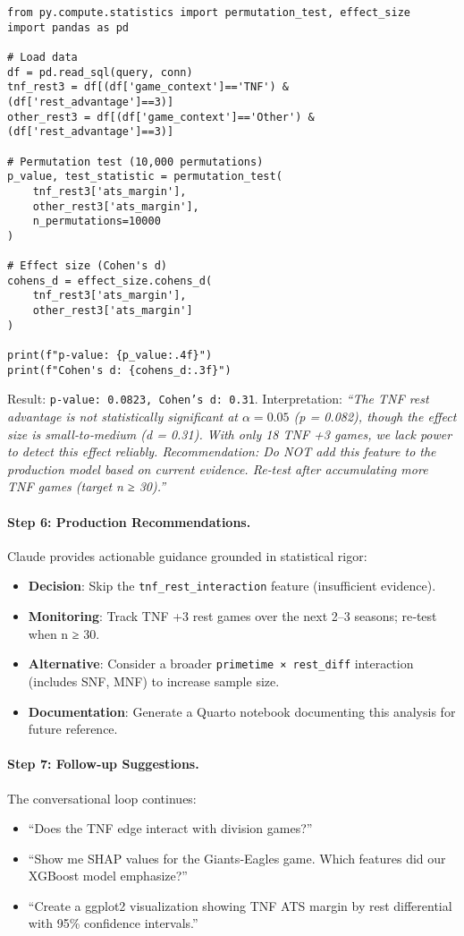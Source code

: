 \begin{verbatim}
from py.compute.statistics import permutation_test, effect_size
import pandas as pd

# Load data
df = pd.read_sql(query, conn)
tnf_rest3 = df[(df['game_context']=='TNF') & (df['rest_advantage']==3)]
other_rest3 = df[(df['game_context']=='Other') & (df['rest_advantage']==3)]

# Permutation test (10,000 permutations)
p_value, test_statistic = permutation_test(
    tnf_rest3['ats_margin'],
    other_rest3['ats_margin'],
    n_permutations=10000
)

# Effect size (Cohen's d)
cohens_d = effect_size.cohens_d(
    tnf_rest3['ats_margin'],
    other_rest3['ats_margin']
)

print(f"p-value: {p_value:.4f}")
print(f"Cohen's d: {cohens_d:.3f}")
\end{verbatim}

Result: \texttt{p-value: 0.0823, Cohen's d: 0.31}. Interpretation: \textit{``The TNF rest advantage is not statistically significant at $\alpha = 0.05$ (p = 0.082), though the effect size is small‑to‑medium (d = 0.31). With only 18 TNF +3 games, we lack power to detect this effect reliably. Recommendation: Do NOT add this feature to the production model based on current evidence. Re‑test after accumulating more TNF games (target n ≥ 30).''}

\paragraph{Step 6: Production Recommendations.}
Claude provides actionable guidance grounded in statistical rigor:
\begin{itemize}
\item \textbf{Decision}: Skip the \texttt{tnf\_rest\_interaction} feature (insufficient evidence).
\item \textbf{Monitoring}: Track TNF +3 rest games over the next 2--3 seasons; re‑test when n ≥ 30.
\item \textbf{Alternative}: Consider a broader \texttt{primetime × rest\_diff} interaction (includes SNF, MNF) to increase sample size.
\item \textbf{Documentation}: Generate a Quarto notebook documenting this analysis for future reference.
\end{itemize}

\paragraph{Step 7: Follow‑up Suggestions.}
The conversational loop continues:
\begin{itemize}
\item ``Does the TNF edge interact with division games?''
\item ``Show me SHAP values for the Giants‑Eagles game. Which features did our XGBoost model emphasize?''
\item ``Create a ggplot2 visualization showing TNF ATS margin by rest differential with 95\% confidence intervals.''
\end{itemize}

